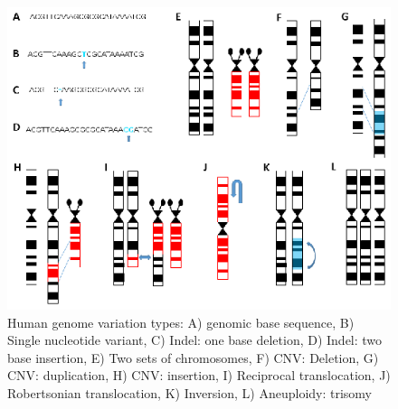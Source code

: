 \begin{figure}[!ht]
	\includegraphics[width=1.0\linewidth]{img/Introduction_Fig1}
	\caption[Human genome variation types]{Human genome variation types: A) genomic base sequence, B) Single nucleotide variant, C) Indel: one base deletion, D) Indel: two base insertion, E) Two sets of chromosomes, F) CNV: Deletion, G) CNV: duplication, H) CNV: insertion, I) Reciprocal translocation, J) Robertsonian translocation, K) Inversion, L) Aneuploidy: trisomy}
	\label{fig:Introduction_Fig1}
\end{figure}



